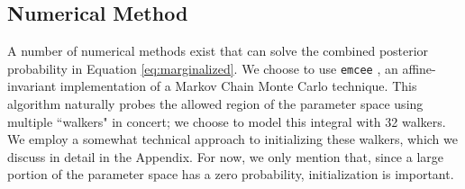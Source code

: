 \documentclass[12pt, preprint]{aastex}
\newcommand{\given}{\,|\,}
\begin{document}

 


\subsection{Numerical Method}

A number of numerical methods exist that can solve the combined posterior probability in Equation \ref{eq:marginalized}. We choose to use {\tt emcee} \citep{foreman-mackey13}, an affine-invariant implementation of a Markov Chain Monte Carlo technique. This algorithm naturally probes the allowed region of the parameter space using multiple ``walkers" in concert; we choose to model this integral with 32 walkers. We employ a somewhat technical approach to initializing these walkers, which we discuss in detail in the Appendix. For now, we only mention that, since a large portion of the parameter space has a zero probability, initialization is important.
\end{document}
